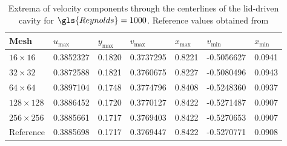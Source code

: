 \begin{table}[]
	\centering
	\begin{tabular}{lllllrr}
		\hline
		Mesh           & $u_{\text{max}}$ & $y_{\text{max}}$ & $v_{\text{max}}$ & $x_{\text{max}}$ & \multicolumn{1}{l}{$v_{\text{min}}$} & \multicolumn{1}{l}{$x_{\text{min}}$} \\ \hline
		$16\times16$   & 0.3852327        & 0.1820           & 0.3737295        & 0.8221           & -0.5056627                           & 0.0941                               \\
		$32\times32$   & 0.3872588        & 0.1821           & 0.3760675        & 0.8227           & -0.5080496                           & 0.0943                               \\
		$64\times64$   & 0.3897104        & 0.1748           & 0.3774796        & 0.8408           & -0.5248360                           & 0.0937                               \\
		$128\times128$ & 0.3886452        & 0.1720           & 0.3770127        & 0.8422           & -0.5271487                           & 0.0907                               \\
		$256\times256$ & 0.3885661        & 0.1717           & 0.3769403        & 0.8422           & -0.5270653                           & 0.0907                               \\\hline
		Reference      & 0.3885698        & 0.1717           & 0.3769447        & 0.8422           & \multicolumn{1}{l}{-0.5270771}       & \multicolumn{1}{l}{0.0908}           \\ \hline
	\end{tabular}
	\caption{Extrema of velocity components through the centerlines of the lid-driven cavity for $\gls{Reynolds} = 1000$. Reference values obtained from \cite{botellaBenchmarkSpectralResults1998} }
	\label{tab:LidCavityExtrema}
\end{table}
\FloatBarrier
\newpage